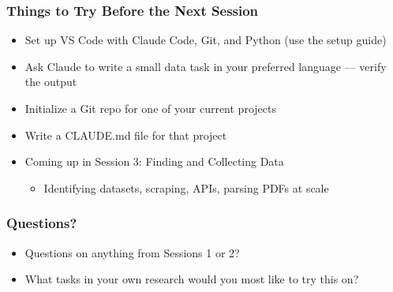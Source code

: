 \documentclass[aspectratio=169, 12pt]{beamer}
\begin{document}
\begin{frame}
\frametitle{Things to Try Before the Next Session}

\begin{itemize}
    \item Set up VS Code with Claude Code, Git, and Python (use the setup guide)
    \item Ask Claude to write a small data task in your preferred language --- verify the output
    \item Initialize a Git repo for one of your current projects
    \item Write a CLAUDE.md file for that project
    \vspace{.05in}
    \item Coming up in Session 3: Finding and Collecting Data
        \begin{itemize}
            \item[$\circ$] Identifying datasets, scraping, APIs, parsing PDFs at scale
        \end{itemize}
\end{itemize}

\end{frame}



\begin{frame}
\frametitle{Questions?}

\begin{itemize}
    \item Questions on anything from Sessions 1 or 2?
    \item What tasks in your own research would you most like to try this on?
\end{itemize}

\end{frame}
\end{document}
